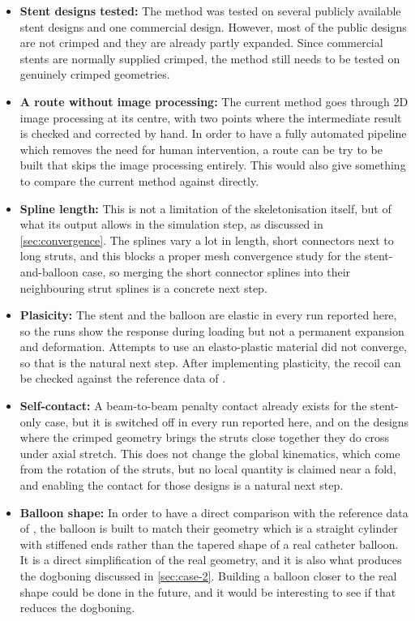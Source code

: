 \begin{itemize}[nosep,leftmargin=*]
  \item \textbf{Stent designs tested:} The method was tested on several publicly available stent designs and one commercial design. However, most of the public designs are not crimped and they are already partly expanded. Since commercial stents are normally supplied crimped, the method still needs to be tested on genuinely crimped geometries.
  \item \textbf{A route without image processing:} The current method goes through 2D image processing at its centre, with two points where the intermediate result is checked and corrected by hand. In order to have a fully automated pipeline which removes the need for human intervention, a route can be try to be built that skips the image processing entirely. This would also give something to compare the current method against directly. 
  \item \textbf{Spline length:} This is not a limitation of the skeletonisation itself, but of what its output allows in the simulation step, as discussed in \cref{sec:convergence}. The splines vary a lot in length, short connectors next to long struts, and this blocks a proper mesh convergence study for the stent-and-balloon case, so merging the short connector splines into their neighbouring strut splines is a concrete next step.
  \item \textbf{Plasicity:} The stent and the balloon are elastic in every run reported here, so the runs show the response during loading but not a permanent expansion and deformation. Attempts to use an elasto-plastic material did not converge, so that is the natural next step. After implementing plasticity, the recoil can be checked against the reference data of \citet{datz2025}.
  \item \textbf{Self-contact:} A beam-to-beam penalty contact already exists for the stent-only case, but it is switched off in every run reported here, and on the designs where the crimped geometry brings the struts close together they do cross under axial stretch. This does not change the global kinematics, which come from the rotation of the struts, but no local quantity is claimed near a fold, and enabling the contact for those designs is a natural next step.
  \item \textbf{Balloon shape:} In order to have a direct comparison with the reference data of \citet{datz2025}, the balloon is built to match their geometry which is a straight cylinder with stiffened ends rather than the tapered shape of a real catheter balloon. It is a direct simplification of the real geometry, and it is also what produces the dogboning discussed in \cref{sec:case-2}. Building a balloon closer to the real shape could be done in the future, and it would be interesting to see if that reduces the dogboning.

\end{itemize}
